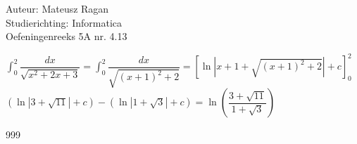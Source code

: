 \documentclass[a4paper]{article}
\begin{document}
\noindent \large Auteur: Mateusz Ragan \\
\noindent \large Studierichting: Informatica\\
\noindent \large Oefeningenreeks 5A nr. 4.13\\

\medskip

\normalsize

$\displaystyle\int_{0}^{2}\dfrac{dx}{\sqrt{x^2+2x+3}} = \displaystyle\int_{0}^{2}\dfrac{dx}{\sqrt{(x+1)^2 + 2}} = \left[ \ln \left|x+1 + \sqrt{(x+1)^2 + 2}\right| + c \right]_{0}^{2}$\\

$\left( \ln |3 + \sqrt{11}| + c \right) - \left( \ln | 1 + \sqrt{3}| + c \right) = \ln\left( \dfrac{3+\sqrt{11}}{1+\sqrt{3}} \right)$

\begin{thebibliography}{999}
\end{thebibliography}
\end{document}
